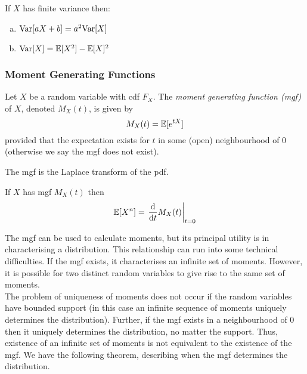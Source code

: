 \begin{theorem}
    If $X$ has finite variance then:
    \begin{enumerate}[a.]
        \item $\text{Var}{}[aX + b] = a^2\text{Var}{}[X]$
        \item $\text{Var}{}[X] = \mathbb{E}{}[X^2] - \mathbb{E}{}[X]^2$
    \end{enumerate}
\end{theorem}

\subsubsection{Moment Generating Functions}
\begin{definition}
    Let $X$ be a random variable with cdf $F_X$. The \emph{moment generating function (mgf)} of $X$, denoted $M_X(t)$, is given by
    \[
        M_X(t) = \mathbb{E}{}[e^{tX}]
    \]
    provided that the expectation exists for $t$ in some (open) neighbourhood of 0 (otherwise we say the mgf does not exist).
\end{definition}

\begin{remark}
    The mgf is the Laplace transform of the pdf.
\end{remark}

\begin{theorem}
    If $X$ has mgf $M_X(t)$ then
    \[
        \mathbb{E}{}[X^n] = \left. \frac{\text{d}}{\text{d} t}M_X(t)\right|_{t=0}
    \]
\end{theorem}

The mgf can be used to calculate moments, but its principal utility is in characterising a distribution. This relationship can run into some technical difficulties. If the mgf exists, it characterises an infinite set of moments. However, it is possible for two distinct random variables to give rise to the same set of moments.\\
    
The problem of uniqueness of moments does not occur if the random variables have bounded support (in this case an infinite sequence of moments uniquely determines the distribution). Further, if the mgf exists in a neighbourhood of 0 then it uniquely determines the distribution, no matter the support. Thus, existence of an infinite set of moments is not equivalent to the existence of the mgf. We have the following theorem, describing when the mgf determines the distribution.   

